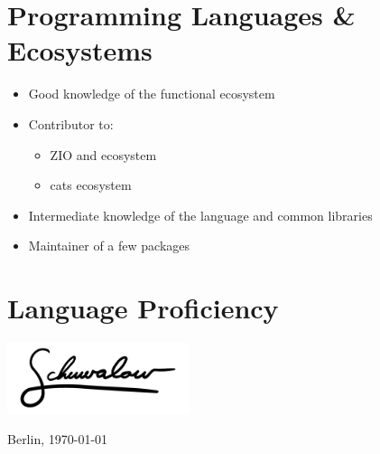 \documentclass[10pt,a4paper,sans]{moderncv}
\begin{document}
\section{Programming Languages \& Ecosystems}
 {
  \begin{itemize}
    \item Good knowledge of the functional ecosystem
    \item Contributor to:
    \begin{itemize}
        \item ZIO and ecosystem
        \item cats ecosystem
    \end{itemize}
  \end{itemize}
}
 {
  \begin{itemize}
      \item Intermediate knowledge of the language and common libraries
  \end{itemize}
}
 {
  \begin{itemize}
      \item Maintainer of a few packages
  \end{itemize}
}

\section{Language Proficiency}

\emptysection{}\closesection
\vfill
\vspace{-1cm}
\begin{flushright}
  \includegraphics[width=0.4\textwidth]{signature}

  Berlin, \today
\end{flushright}
\end{document}
